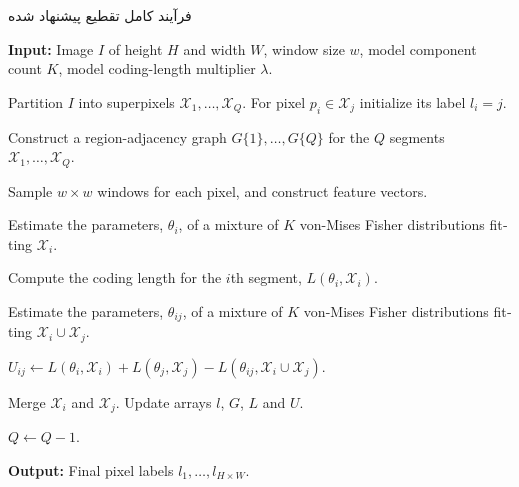 \begin{algorithm}[htb]
	\caption{\small فرآیند کامل تقطیع پیشنهاد شده}
	\label{alg.full_algorithm}
	\begin{algorithmic}
		\begin{latin}
\STATE \textbf{Input:} Image $I$ of height $H$ and width $W$, window size $w$, model component count $K$, model coding-length multiplier $\lambda$.

\STATE Partition $I$ into superpixels $\mathcal{X}_1,\dots,\mathcal{X}_Q$. For pixel $p_i \in \mathcal{X}_j$ initialize its label $l_i=j$.

\STATE Construct a region-adjacency graph $G\{1\},\dots,G\{Q\}$ for the $Q$ segments $\mathcal{X}_1,\dots,\mathcal{X}_Q$.

\STATE Sample $w \times w$ windows for each pixel, and construct feature vectors.


\STATE Estimate the parameters, $\theta_i$, of a mixture of $K$ von-Mises Fisher distributions fitting $\mathcal{X}_i$.

\STATE Compute the coding length for the $i$th segment, $L(\theta_i,\mathcal{X}_i)$.


	\STATE Estimate the parameters, $\theta_{ij}$, of a mixture of $K$ von-Mises Fisher distributions fitting $\mathcal{X}_i \cup \mathcal{X}_j$.
	
	\STATE $U_{ij} \gets L(\theta_i,\mathcal{X}_i) + L(\theta_j,\mathcal{X}_j) - L(\theta_{ij},\mathcal{X}_i \cup \mathcal{X}_j)$.

\ENDFOR


	\STATE Merge $\mathcal{X}_i$ and $\mathcal{X}_j$. Update arrays $l$, $G$, $L$ and $U$.
	
	\STATE $Q \gets Q-1$.

\ENDWHILE

\ENDFOR

\STATE \textbf{Output:} Final pixel labels $l_1,\dots,l_{H \times W}$.

		\end{latin}
	\end{algorithmic}
\end{algorithm}









